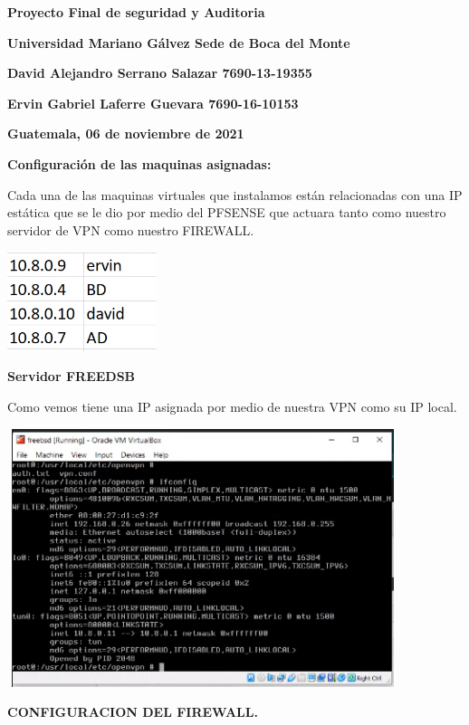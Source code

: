 


\textbf{Proyecto Final de seguridad y Auditoria}

\textbf{Universidad Mariano G\'{a}lvez Sede de Boca del Monte}

\textbf{David Alejandro Serrano Salazar 7690-13-19355}

\textbf{Ervin Gabriel Laferre Guevara 7690-16-10153}

\textbf{Guatemala, 06 de noviembre de 2021}

\textbf{}

\textbf{}

\textbf{Configuraci\'{o}n de las maquinas asignadas:}



Cada una de las maquinas virtuales que instalamos est\'{a}n relacionadas con una IP est\'{a}tica que se le dio por medio del PFSENSE que actuara tanto como nuestro servidor de VPN como nuestro FIREWALL.



\includegraphics*[width=1.72in, height=1.14in]{image1}

\textbf{Servidor FREEDSB}

Como vemos tiene una IP asignada por medio de nuestra VPN como su IP local.



\includegraphics*[width=4.50in, height=2.97in, trim=0.00in 0.05in 0.07in 0.07in]{image2}



\textbf{CONFIGURACION DEL FIREWALL.}

